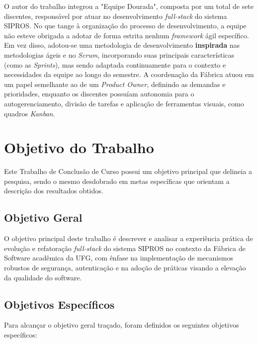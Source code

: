 O autor do trabalho integrou a "Equipe Dourada", composta por um total de sete discentes, responsável por atuar no desenvolvimento \textit{full-stack} do sistema SIPROS. No que tange à organização do processo de desenvolvimento, a equipe não esteve obrigada a adotar de forma estrita nenhum \textit{framework} ágil específico. Em vez disso, adotou-se uma metodologia de desenvolvimento \textbf{inspirada} nas metodologias ágeis e no \textit{Scrum}, incorporando suas principais características (como as \textit{Sprints}), mas sendo adaptada continuamente para o contexto e necessidades da equipe ao longo do semestre. A coordenação da Fábrica atuou em um papel semelhante ao de um \textit{Product Owner}, definindo as demandas e prioridades, enquanto os discentes possuíam autonomia para o autogerenciamento, divisão de tarefas e aplicação de ferramentas visuais, como quadros \textit{Kanban}.

\section{Objetivo do Trabalho}

Este Trabalho de Conclusão de Curso possui um objetivo principal que delineia a pesquisa, sendo o mesmo desdobrado em metas específicas que orientam a descrição dos resultados obtidos.

\subsection{Objetivo Geral}

O objetivo principal deste trabalho é descrever e analisar a experiência prática de evolução e refatoração \textit{full-stack} do sistema SIPROS no contexto da Fábrica de Software acadêmica da UFG, com ênfase na implementação de mecanismos robustos de segurança, autenticação e na adoção de práticas visando a elevação da qualidade do software.

\subsection{Objetivos Específicos}

Para alcançar o objetivo geral traçado, foram definidos os seguintes objetivos específicos:

